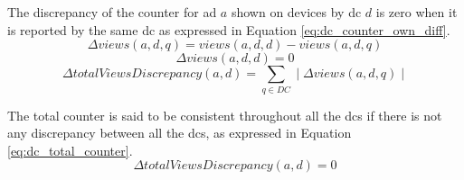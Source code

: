The discrepancy of the counter for ad $a$ shown on devices by \gls{dc} $d$ is zero when it is reported by the same \gls{dc} as expressed in Equation \ref{eq:dc_counter_own_diff}.
\begin{equation} \label{eq:dc_counter_diff}
	\Delta views(a, d, q) = views(a, d, d) - views(a, d, q)
\end{equation}
\begin{equation} \label{eq:dc_counter_own_diff}
	\Delta views(a, d, d) = 0
\end{equation}
\begin{equation} \label{eq:dc_total_counter_diff}
	\Delta totalViewsDiscrepancy(a, d) = \sum_{q \in DC} \mid \Delta views(a, d, q) \mid
\end{equation}

The total counter is said to be consistent throughout all the \glspl{dc} if there is not any discrepancy between all the \glspl{dc}, as expressed in Equation \ref{eq:dc_total_counter}.
\begin{equation} \label{eq:dc_total_counter_coherent}
	\Delta totalViewsDiscrepancy(a, d) = 0
\end{equation}
